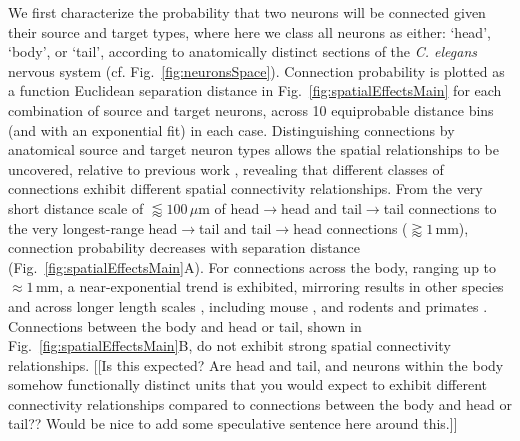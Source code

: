 \documentclass[10pt,letterpaper]{article}
\begin{document}
We first characterize the probability that two neurons will be connected given their source and target types, where here we class all neurons as either: `head', `body', or `tail', according to anatomically distinct sections of the \emph{C. elegans} nervous system (cf. Fig.~\ref{fig:neuronsSpace}).
Connection probability is plotted as a function Euclidean separation distance in Fig.~\ref{fig:spatialEffectsMain} for each combination of source and target neurons, across 10 equiprobable distance bins (and with an exponential fit) in each case.
Distinguishing connections by anatomical source and target neuron types allows the spatial relationships to be uncovered, relative to previous work \cite{Azulay:2016cg}, revealing that different classes of connections exhibit different spatial connectivity relationships.
From the very short distance scale of $\lessapprox 100\,\mu$m of head$\rightarrow$head and tail$\rightarrow$tail connections to the very longest-range head$\rightarrow$tail and tail$\rightarrow$head connections ($\gtrapprox 1\,$mm), connection probability decreases with separation distance (Fig.~\ref{fig:spatialEffectsMain}A).
For connections across the body, ranging up to $\approx 1$\,mm, a near-exponential trend is exhibited, mirroring results in other species and across longer length scales \cite{Wang:2016gg}, including mouse \cite{Goulas:2016hr, Fulcher:2016ck}, and rodents and primates \cite{Horvat:2016ia}.
Connections between the body and head or tail, shown in Fig.~\ref{fig:spatialEffectsMain}B, do not exhibit strong spatial connectivity relationships.
[[Is this expected? Are head and tail, and neurons within the body somehow functionally distinct units that you would expect to exhibit different connectivity relationships compared to connections between the body and head or tail?? Would be nice to add some speculative sentence here around this.]]
\end{document}
